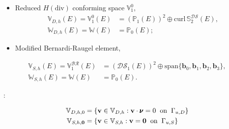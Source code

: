 \documentclass[usenames,dvipsnames,letterpaper,landscape,final]{slides}
\begin{document}
\begin{myslide}

\begin{itemize}
		  \item Reduced $H(\text{div})$ conforming space $\mathbb{V}_1^0$,
\begin{equation}
\begin{aligned}
		  \mathbb{V}_{D,h}(E) = \mathbb{V}_1^0(E) &= (\mathbb{P}_1(E))^2 \oplus 
		  \text{curl}\,\mathbb{S}_2^{\mathcal{DS}}(E), \\
					 \mathbb{W}_{D,h}(E) = \mathbb{W}(E) &= \mathbb{P}_0(E);
\end{aligned}
\end{equation}

\vspace{20pt}

\item Modified Bernardi-Raugel element,
\end{itemize}
\begin{equation}
\begin{aligned}
		  \mathbb{V}_{S,h}(E) = \mathbb{V}^{\mathcal{BR}}_1(E) &= (\mathcal{DS}_1(E))^2 \oplus \text{span}\{\mathbf{b}_0,\mathbf{b}_1,\mathbf{b}_2,\mathbf{b}_3 \}, \\
		  \mathbb{W}_{S,h}(E) = \mathbb{W}(E)   &= \mathbb{P}_0(E).
		  \end{aligned}
\end{equation}

\vspace{20pt}

:

\begin{equation}
		  \begin{aligned}
					 \mathbb{V}_{D,h,0} &= \{\mathbf{v} \in \mathbb{V}_{D,h} : \mathbf{v}\cdot \pmb{\nu} = 0 \hspace{0.2cm} \text{on} \hspace{0.2cm} \Gamma_{u,D}\} \\
					 \mathbb{V}_{S,h,\mathbf{0}} &= \{\mathbf{v} \in \mathbb{V}_{S,h} : \mathbf{v} = \mathbf{0} \hspace{0.2cm} \text{on} \hspace{0.2cm} \Gamma_{u,S}\} 
		  \end{aligned}
\end{equation}

\end{myslide}
\end{document}
